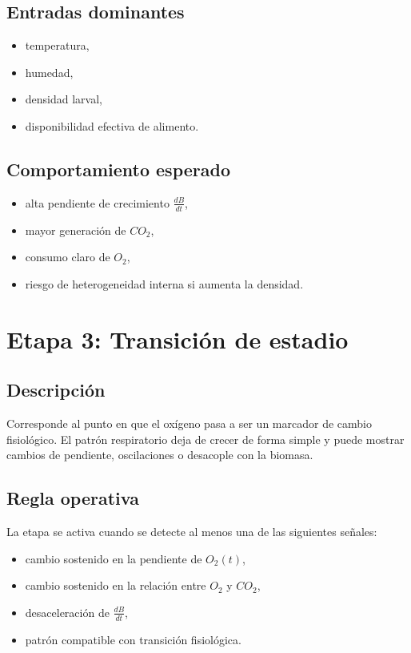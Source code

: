 \documentclass[12pt,a4paper]{report}
\begin{document}
\subsection*{Entradas dominantes}
\begin{itemize}[leftmargin=0.7cm]
    \item temperatura,
    \item humedad,
    \item densidad larval,
    \item disponibilidad efectiva de alimento.
\end{itemize}

\subsection*{Comportamiento esperado}
\begin{itemize}[leftmargin=0.7cm]
    \item alta pendiente de crecimiento \(\frac{dB}{dt}\),
    \item mayor generación de \(CO_2\),
    \item consumo claro de \(O_2\),
    \item riesgo de heterogeneidad interna si aumenta la densidad.
\end{itemize}

\section{Etapa 3: Transición de estadio}

\subsection*{Descripción}
Corresponde al punto en que el oxígeno pasa a ser un marcador de cambio fisiológico. El patrón respiratorio deja de crecer de forma simple y puede mostrar cambios de pendiente, oscilaciones o desacople con la biomasa.

\subsection*{Regla operativa}
La etapa se activa cuando se detecte al menos una de las siguientes señales:
\begin{itemize}[leftmargin=0.7cm]
    \item cambio sostenido en la pendiente de \(O_2(t)\),
    \item cambio sostenido en la relación entre \(O_2\) y \(CO_2\),
    \item desaceleración de \(\frac{dB}{dt}\),
    \item patrón compatible con transición fisiológica.
\end{itemize}
\end{document}
